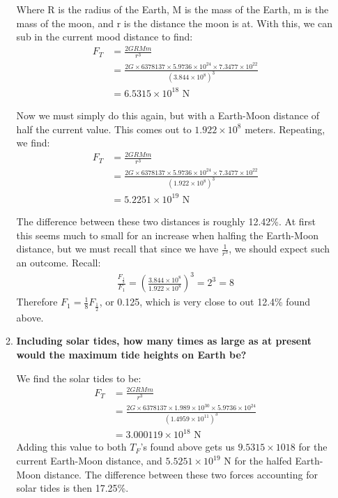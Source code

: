 \documentclass[10pt]{article}
\begin{document}
\begin{enumerate}
\begin{enumerate}
			Where R is the radius of the Earth, M is the mass of the Earth, m is the mass of the moon, and r is the distance the moon is at. With this, we can sub in the current mood distance to find:
			\begin{align*}
				F_T &= \frac{2GRMm}{r^3} \\
				&= \frac{2G \times 6378137 \times 5.9736 \times 10^{24} \times 7.3477 \times 10^{22}}{(3.844 \times 10^8)^3} \\
				&= 6.5315 \times 10^{18} \text{ N}
			\end{align*}
			
			Now we must simply do this again, but with a Earth-Moon distance of half the current value. This comes out to $1.922 \times 10^8$ meters. Repeating, we find:
			\begin{align*}
			F_T &= \frac{2GRMm}{r^3} \\
			&= \frac{2G \times 6378137 \times 5.9736 \times 10^{24} \times 7.3477 \times 10^{22}}{(1.922 \times 10^8)^3} \\
			&= 5.2251 \times 10^{19} \text{ N}
			\end{align*}
			
			The difference between these two distances is roughly 12.42\%. At first this seems much to small for an increase when halfing the Earth-Moon distance, but we must recall that since we have $\frac{1}{r^3}$, we should expect such an outcome. Recall:
			\begin{align*}
				\frac{F_\frac{1}{2}}{F_1} = \left( \frac{3.844 \times 10^8}{1.922 \times 10^8}\right)^3 = 2^3 = 8
			\end{align*}
			Therefore $F_1 = \frac{1}{8} F_\frac{1}{2}$, or 0.125, which is very close to out 12.4\% found above.
			
			\item  \textbf{Including solar tides, how many times as large as at present would the maximum tide heights on Earth be?}
			 
			We find the solar tides to be:
			\begin{align*}
				F_T &= \frac{2GRMm}{r^3} \\
				&= \frac{2G \times 6378137 \times 1.989 \times 10^{30} \times 5.9736 \times 10^{24}}{(1.4959 \times 10^{11})^3} \\
				&= 3.000119 \times 10^{18} \text{ N}
			\end{align*}
			Adding this value to both $T_F$'s found above gets us $9.5315 \times 10{18}$ for the current Earth-Moon distance, and $5.5251\times 10^{19}$ N for the halfed Earth-Moon distance. The difference between these two forces accounting for solar tides is then 17.25\%.
			

\end{enumerate}
\end{enumerate}
\end{document}
